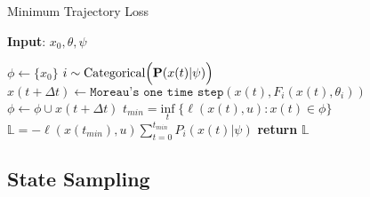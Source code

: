 \begin{enumerate}
    \begin{algorithm}[tb]
        \caption{Minimum Trajectory Loss}
        \label{algo:mtl}
        \small
        \hspace*{\algorithmicindent} \textbf{Input}: $x_0, \theta, \psi$
        \begin{algorithmic}[1]
            \State $\phi \leftarrow \{ x_0 \}$
                    \State $i \sim \text{Categorical}\Bigl(\mathbf{P}(x(t)| \psi)\Bigr)$ 
                    \State $x(t + \Delta t) \leftarrow \texttt{Moreau's one time step}(x(t), F_i(x(t), \theta_i))$
                    \State $\phi \leftarrow \phi \cup x(t+\Delta t)$
                \EndFor
                \State $t_{min} = \underset{t}{\textrm{inf}} \; \{ \ell(x(t), u): x(t) \in \phi\}$
                \State $\mathbb{L} = - \ell(x(t_{min}), u) \sum_{t=0}^{t_{min}}P_i(x(t) | \psi)  $
            \State \textbf{return} $\mathbb{L}$
        \end{algorithmic}
    \end{algorithm}
\end{enumerate}

\subsection{State Sampling}
\label{ssec:state_sampling}

